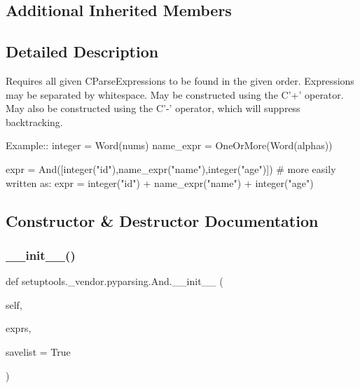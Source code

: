 \subsection*{Additional Inherited Members}


\subsection{Detailed Description}
\begin{DoxyVerb}Requires all given C{ParseExpression}s to be found in the given order.
Expressions may be separated by whitespace.
May be constructed using the C{'+'} operator.
May also be constructed using the C{'-'} operator, which will suppress backtracking.

Example::
    integer = Word(nums)
    name_expr = OneOrMore(Word(alphas))

    expr = And([integer("id"),name_expr("name"),integer("age")])
    # more easily written as:
    expr = integer("id") + name_expr("name") + integer("age")
\end{DoxyVerb}
 

\subsection{Constructor \& Destructor Documentation}
\mbox{\label{classsetuptools_1_1__vendor_1_1pyparsing_1_1And_a59d77c899356bf54d089ad7a17a5ecd3}} 
\subsubsection{\texorpdfstring{\+\_\+\+\_\+init\+\_\+\+\_\+()}{\_\_init\_\_()}}
{\footnotesize\ttfamily def setuptools.\+\_\+vendor.\+pyparsing.\+And.\+\_\+\+\_\+init\+\_\+\+\_\+ (\begin{DoxyParamCaption}\item[{}]{self,  }\item[{}]{exprs,  }\item[{}]{savelist = {\ttfamily True} }\end{DoxyParamCaption})}



